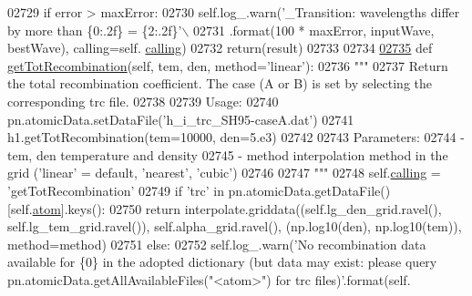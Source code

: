 \begin{DoxyCode}
{{{{{{{{{{{{{{{{{{{{{{02729         \textcolor{keywordflow}{if} error > maxError:
02730             self.log\_.warn(\textcolor{stringliteral}{'\_Transition: wavelengths differ by more than \{0:.2f\}%
       = \{2:.2f\}'}\(\backslash\)
02731                            .format(100 * maxError, inputWave, bestWave), calling=self.
      \hyperlink{classpyneb_1_1core_1_1pynebcore_1_1_rec_atom_a82ec425ebba32b73a5d9ae52717d47c4}{calling})
02732         return(result)
02733 
02734 
\hypertarget{pynebcore_8py_source_l02735}{}\hyperlink{classpyneb_1_1core_1_1pynebcore_1_1_rec_atom_ab7e0b11cdc85dade76528fe5de9886c0}{02735}     \textcolor{keyword}{def }\hyperlink{classpyneb_1_1core_1_1pynebcore_1_1_rec_atom_ab7e0b11cdc85dade76528fe5de9886c0}{getTotRecombination}(self, tem, den, method='linear'):
02736         \textcolor{stringliteral}{"""}
02737 \textcolor{stringliteral}{        Return the total recombination coefficient. The case (A or B) is set by selecting the corresponding
       trc file.}
02738 \textcolor{stringliteral}{        }
02739 \textcolor{stringliteral}{        Usage:}
02740 \textcolor{stringliteral}{            pn.atomicData.setDataFile('h\_i\_trc\_SH95-caseA.dat')}
02741 \textcolor{stringliteral}{            h1.getTotRecombination(tem=10000, den=5.e3)}
02742 \textcolor{stringliteral}{            }
02743 \textcolor{stringliteral}{        Parameters:}
02744 \textcolor{stringliteral}{            - tem, den  temperature and density}
02745 \textcolor{stringliteral}{            - method    interpolation method in the grid ('linear' = default, 'nearest', 'cubic')    }
02746 \textcolor{stringliteral}{                }
02747 \textcolor{stringliteral}{        """} 
02748         self.\hyperlink{classpyneb_1_1core_1_1pynebcore_1_1_rec_atom_a82ec425ebba32b73a5d9ae52717d47c4}{calling} = \textcolor{stringliteral}{'getTotRecombination'}
02749         \textcolor{keywordflow}{if} \textcolor{stringliteral}{'trc'} \textcolor{keywordflow}{in} pn.atomicData.getDataFile()[self.\hyperlink{classpyneb_1_1core_1_1pynebcore_1_1_rec_atom_a1a2aa175da6b5b8847f409e37437e3d3}{atom}].keys():
02750             \textcolor{keywordflow}{return} interpolate.griddata((self.lg\_den\_grid.ravel(), self.lg\_tem\_grid.ravel()), 
      self.alpha\_grid.ravel(), (np.log10(den), np.log10(tem)), method=method)
02751         \textcolor{keywordflow}{else}:
02752             self.log\_.warn(\textcolor{stringliteral}{'No recombination data available for \{0\} in the adopted dictionary (but data may
       exist: please query pn.atomicData.getAllAvailableFiles("<atom>") for trc files)'}.format(self.
}}}}}}}}}}}}}}}}}}}}}}
\end{DoxyCode}
